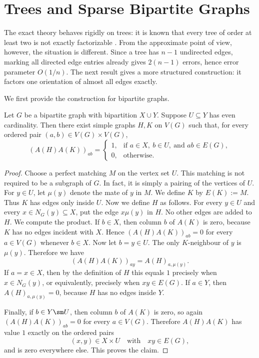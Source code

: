 \documentclass{file}
\begin{document}
\section{Trees and Sparse Bipartite Graphs}
\label{sec:trees}

The exact theory behaves rigidly on trees: it is known that every tree of order at least two is not exactly factorizable \cite{miraftab2025factorability}.
From the approximate point of view, however, the situation is different.  
Since a tree has $n-1$ undirected edges, marking all directed edge entries already gives $2(n-1)$ errors, hence error parameter $O(1/n)$.  
The next result gives a more structured construction: it factors one orientation of almost all edges exactly.

We first provide the construction for bipartite graphs.

\begin{lem}
\label{lem:bipartite-one-sided}
Let $G$ be a bipartite graph with bipartition $X\cup Y$.  Suppose $U\subseteq Y$ has even cardinality.  
Then there exist simple graphs $H,K$ on $V(G)$ such that, for every ordered pair $(a,b)\in V(G)\times V(G)$,
\[
  (A(H)A(K))_{ab}
  =
  \begin{cases}
  1, & \text{if } a\in X,\ b\in U,\ \text{and } ab\in E(G),\\
  0, & \text{otherwise.}
  \end{cases}
\]
\end{lem}

\begin{proof}
Choose a perfect matching $M$ on the vertex set $U$.  
This matching is not required to be a subgraph of $G$.
In fact, it is simply a pairing of the vertices of $U$.  
For $y\in U$, let $\mu(y)$ denote the mate of $y$ in $M$.
We define $K$ by $E(K):=M$.
Thus $K$ has edges only inside $U$.
Now we define $H$ as follows.  
For every $y\in U$ and every $x\in N_G(y)\subseteq X$, put the edge $x\mu(y)$
in $H$.  
No other edges are added to $H$.
We compute the product.  
If $b\in X$, then column $b$ of $A(K)$ is zero,
because $K$ has no edges incident with $X$.  Hence $(A(H)A(K))_{ab}=0$ for every $a\in V(G)$ whenever $b\in X$.
Now let $b=y\in U$.  
The only $K$-neighbour of $y$ is $\mu(y)$.  
Therefore we have
\[
  (A(H)A(K))_{ay}
  =
  A(H)_{a,\mu(y)}.
\]
If $a=x\in X$, then by the definition of $H$ this equals $1$ precisely when $x\in N_G(y)$, or equivalently, precisely when $xy\in E(G)$.
If $a\in Y$, then $A(H)_{a,\mu(y)}=0$,
because $H$ has no edges inside $Y$.

Finally, if $b\in Y\sm   U$, then column $b$ of $A(K)$ is zero, so again $(A(H)A(K))_{ab}=0$ for every $a\in V(G)$.
Therefore $A(H)A(K)$ has value $1$ exactly on the ordered pairs
\[
  (x,y)\in X\times U
  \quad\text{with}\quad
  xy\in E(G),
\]
and is zero everywhere else.  This proves the claim.
\end{proof}
\end{document}
